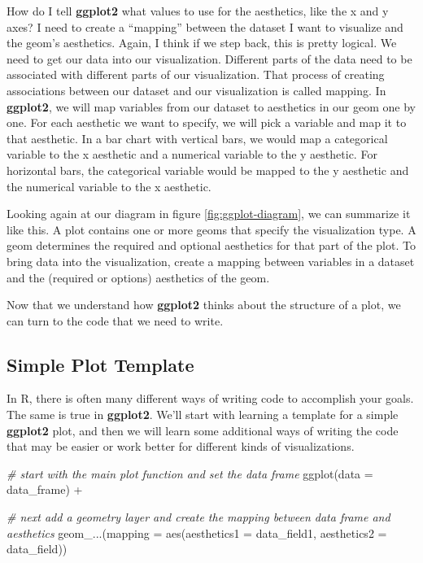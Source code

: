 \documentclass[
]{krantz}
\makeatletter
\newenvironment{Shaded}{\begin{snugshade}}{\end{snugshade}}
\newcommand{\AttributeTok}[1]{\textcolor[rgb]{0.61,0.61,0.61}{#1}}
\newcommand{\CommentTok}[1]{\textcolor[rgb]{0.37,0.37,0.37}{\textit{#1}}}
\newcommand{\FunctionTok}[1]{\textcolor[rgb]{0,0,0}{#1}}
\newcommand{\NormalTok}[1]{#1}
\newcommand{\SpecialCharTok}[1]{\textcolor[rgb]{0,0,0}{#1}}
\newenvironment{kframe}{%
\medskip{}
\setlength{\fboxsep}{.8em}
 \def\at@end@of@kframe{}%
 \ifinner\ifhmode%
  \def\at@end@of@kframe{\end{minipage}}%
  \begin{minipage}{\columnwidth}%
 \fi\fi%
 \def\FrameCommand##1{\hskip\@totalleftmargin \hskip-\fboxsep
 \colorbox{shadecolor}{##1}\hskip-\fboxsep
     \hskip-\linewidth \hskip-\@totalleftmargin \hskip\columnwidth}%
 \MakeFramed {\advance\hsize-\width
   \@totalleftmargin\z@ \linewidth\hsize
   \@setminipage}}%
 {\par\unskip\endMakeFramed%
 \at@end@of@kframe}
\renewenvironment{Shaded}{\begin{kframe}}{\end{kframe}}
\makeatother
\begin{document}
How do I tell \textbf{ggplot2} what values to use for the aesthetics, like the x and y
axes? I need to create a ``mapping'' between the dataset I want to visualize and the
geom's aesthetics. Again, I think if we step back, this is pretty logical. We need
to get our data into our visualization. Different parts of the data need to be
associated with different parts of our visualization. That process of creating
associations between our dataset and our visualization is called mapping. In \textbf{ggplot2},
we will map variables from our dataset to aesthetics in our geom one by one. For
each aesthetic we want to specify, we will pick a variable and map it to that
aesthetic. In a bar chart with vertical bars, we would map a categorical variable
to the x aesthetic and a numerical variable to the y aesthetic. For horizontal bars,
the categorical variable would be mapped to the y aesthetic and the numerical
variable to the x aesthetic.

Looking again at our diagram in figure \ref{fig:ggplot-diagram}, we can summarize
it like this. A plot contains one or more geoms that specify the visualization type.
A geom determines the required and optional aesthetics for that part of the plot.
To bring data into the visualization, create a mapping between variables in a dataset
and the (required or options) aesthetics of the geom.

Now that we understand how \textbf{ggplot2} thinks about the structure of a plot, we can
turn to the code that we need to write.

\hypertarget{simple-plot-template}{%
\subsection{Simple Plot Template}\label{simple-plot-template}}

In R, there is often many different ways of writing code to accomplish your goals.
The same is true in \textbf{ggplot2}. We'll start with learning a template for a simple
\textbf{ggplot2} plot, and then we will learn some additional ways of writing the code
that may be easier or work better for different kinds of visualizations.

\begin{Shaded}
\begin{Highlighting}[]
\CommentTok{\# start with the main plot function and set the data frame}
\FunctionTok{ggplot}\NormalTok{(}\AttributeTok{data =}\NormalTok{ data\_frame) }\SpecialCharTok{+} 
  
\CommentTok{\# next add a geometry layer and create the mapping between data frame and aesthetics}
  \FunctionTok{geom\_...}\NormalTok{(}\AttributeTok{mapping =} \FunctionTok{aes}\NormalTok{(}\AttributeTok{aesthetics1 =}\NormalTok{ data\_field1, }\AttributeTok{aesthetics2 =}\NormalTok{ data\_field))}
\end{Highlighting}
\end{Shaded}
\end{document}
